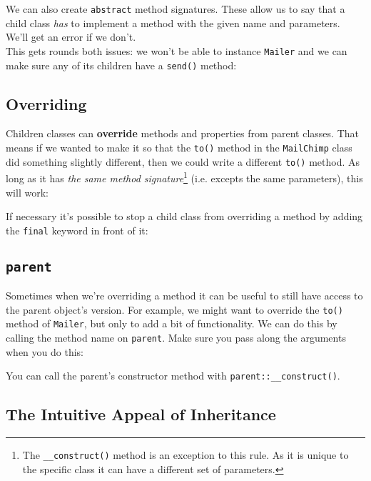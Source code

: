 We can also create \texttt{abstract} method signatures. These allow us to say that a child class \textit{has} to implement a method with the given name and parameters. We'll get an error if we don't.
\\

This gets rounds both issues: we won't be able to instance \texttt{Mailer} and we can make sure any of its children have a \texttt{send()} method:



\subsection{Overriding}

Children classes can \textbf{override} methods and properties from parent classes. That means if we wanted to make it so that the \texttt{to()} method in the \texttt{MailChimp} class did something slightly different, then we could write a different \texttt{to()} method. As long as it has \textit{the same method signature}\footnote{The \texttt{\_\_construct()} method is an exception to this rule. As it is unique to the specific class it can have a different set of parameters.} (i.e. excepts the same parameters), this will work:


If necessary it's possible to stop a child class from overriding a method by adding the \texttt{final} keyword in front of it:


\subsection{\texttt{parent}}

Sometimes when we're overriding a method it can be useful to still have access to the parent object's version. For example, we might want to override the \texttt{to()} method of \texttt{Mailer}, but only to add a bit of functionality. We can do this by calling the method name on \texttt{parent}. Make sure you pass along the arguments when you do this:


You can call the parent's constructor method with \texttt{parent::\_\_construct()}.


\subsection{The Intuitive Appeal of Inheritance}

